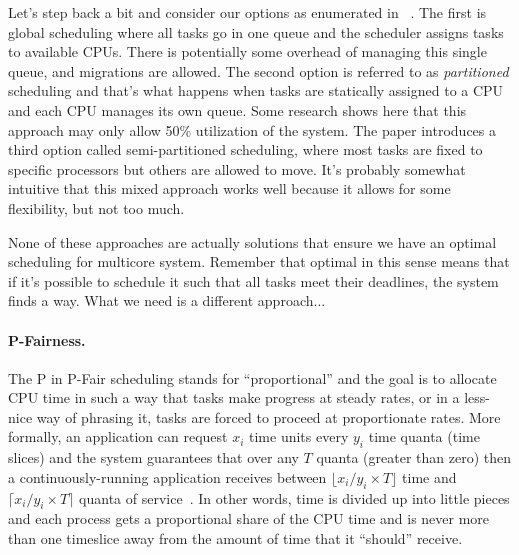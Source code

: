 Let's step back a bit and consider our options as enumerated in ~\cite{globalrts}. The first is global scheduling where all tasks go in one queue and the scheduler assigns tasks to available CPUs. There is potentially some overhead of managing this single queue, and migrations are allowed. The second option is referred to as \textit{partitioned} scheduling and that's what happens when tasks are statically assigned to a CPU and each   CPU manages its own queue. Some research shows here that this approach may only allow 50\% utilization of the system. The paper introduces a third option called semi-partitioned scheduling, where most tasks are fixed to specific processors but others are allowed to move. It's probably somewhat intuitive that this mixed approach works well because it allows for some flexibility, but not too much.

None of these approaches are actually solutions that ensure we have an optimal scheduling for multicore system. Remember that optimal in this sense means that if it's possible to schedule it such that all tasks meet their deadlines, the system finds a way. What we need is a different approach...

\paragraph{P-Fairness.}
The P in P-Fair scheduling stands for ``proportional'' and the goal is to allocate CPU time in such a way that tasks make progress at steady rates, or in a less-nice way of phrasing it, tasks are forced to proceed at proportionate rates. More formally, an application can request $x_i$ time units every $y_i$ time quanta (time slices) and the system guarantees that over any $T$ quanta (greater than zero) then a continuously-running application receives between $\lfloor x_i/y_i \times T\rfloor$ time and $\lceil x_i/y_i \times T\rceil$ quanta of service~\cite{pfair2}. In other words, time is divided up into little pieces and each process gets a proportional share of the CPU time and is never more than one timeslice away from the amount of time that it ``should'' receive.

